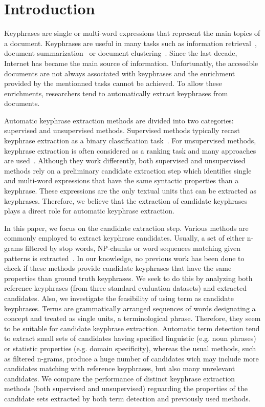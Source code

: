 \section{Introduction}
\label{sec:section}
  Keyphrases are single or multi-word expressions that represent the main topics
  of a document. Keyphrases are useful in many tasks such as information
  retrieval~\cite{medelyan2008smalltrainingset}, document
  summarization~\cite{litvak2008graphbased} or document
  clustering~\cite{han2007webdocumentclustering}. Since the last decade,
  Internet has became the main source of information. Unfortunatly, the
  accessible documents are not always associated with keyphrases and the
  enrichment provided by the mentionned tasks cannot be achieved. To allow these
  enrichments, researchers tend to automatically extract keyphrases from
  documents.

  Automatic keyphrase extraction methods are divided into two categories:
  supervised and unsupervised methods. Supervised methods typically recast
  keyphrase extraction as a binary classification
  task~\cite{witten1999kea,sujian2003maximumentropy,eichler2010keywe}. For
  unsupervised methods, keyphrase extraction is often considered as a
  ranking task and many approaches are
  used~\cite{barker2000nounphrasehead,mihalcea2004textrank}. Although they work
  differently, both supervised and unsupervised methods rely on a preliminary
  candidate extraction step which identifies single and multi-word expressions
  that have the same syntactic properties than a keyphrase. These expressions
  are the only textual units that can be extracted as keyphrases. Therefore, we
  believe that the extraction of candidate keyphrases plays a direct role for
  automatic keyphrase extraction.
  
  In this paper, we focus on the candidate extraction step. Various methods are
  commonly employed to extract keyphrase candidates. Usually, a set of either
  n-grams filtered by stop words, NP-chunks or word sequences matching given
  patterns is extracted~\cite{hulth2003keywordextraction}. In our knowledge, no
  previous work has been done to check if these methods provide candidate
  keyphrases that have the same properties than ground truth keyphrases. We seek
  to do this by analyzing both reference keyphrases (from three standard
  evaluation datasets) and extracted candidates. Also, we investigate the
  feasibility of using term as candidate keyphrases. Terms are grammatically
  arranged sequences of words designating a concept and treated as single units,
  a terminological phrase. Therefore, they seem to be suitable for candidate
  keyphrase extraction. Automatic term detection tend to extract small sets of
  candidates having specified linguistic (e.g. noun phrases) or statistic
  properties (e.g. domain specificity), whereas the usual methods, such as
  filtered n-grams, produce a huge number of candidates wich may include more
  candidates matching with reference keyphrases, but also many unrelevant
  candidates. We compare the performance of distinct keyphrase extraction
  methods (both supervised and unsupervised) reguarding the properties of the
  candidate sets extracted by both term detection and previously used methods.

